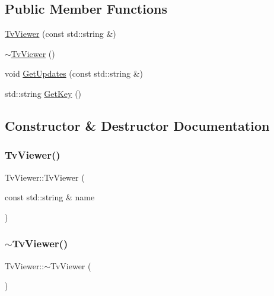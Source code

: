 \subsection*{Public Member Functions}
\begin{DoxyCompactItemize}
\item 
\mbox{\hyperlink{class_tv_viewer_a0dd0a88f2680e4d79e3ae309029a4878}{Tv\+Viewer}} (const std\+::string \&)
\item 
\mbox{\hyperlink{class_tv_viewer_a75bc60d34bf697ad31feb28bd86d4b06}{$\sim$\+Tv\+Viewer}} ()
\item 
void \mbox{\hyperlink{class_tv_viewer_a7454005f7759194c72474f885a649e9b}{Get\+Updates}} (const std\+::string \&)
\item 
std\+::string \mbox{\hyperlink{class_tv_viewer_ae0f96f6541d17b9a4caa81c6bfb054b2}{Get\+Key}} ()
\end{DoxyCompactItemize}


\subsection{Constructor \& Destructor Documentation}
\mbox{\label{class_tv_viewer_a0dd0a88f2680e4d79e3ae309029a4878}} 
\subsubsection{\texorpdfstring{TvViewer()}{TvViewer()}}
{\footnotesize\ttfamily Tv\+Viewer\+::\+Tv\+Viewer (\begin{DoxyParamCaption}\item[{const std\+::string \&}]{name }\end{DoxyParamCaption})}

\mbox{\label{class_tv_viewer_a75bc60d34bf697ad31feb28bd86d4b06}} 
\subsubsection{\texorpdfstring{$\sim$TvViewer()}{~TvViewer()}}
{\footnotesize\ttfamily Tv\+Viewer\+::$\sim$\+Tv\+Viewer (\begin{DoxyParamCaption}{ }\end{DoxyParamCaption})}



